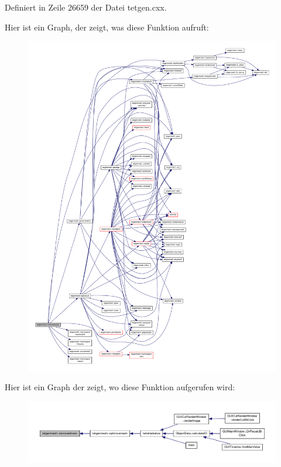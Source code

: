 Definiert in Zeile 26659 der Datei tetgen.\-cxx.



Hier ist ein Graph, der zeigt, was diese Funktion aufruft\-:
\nopagebreak
\begin{figure}[H]
\begin{center}
\leavevmode
\includegraphics[width=350pt]{classtetgenmesh_ad5c46c2f6c9adeed23fc8c64b682778d_cgraph}
\end{center}
\end{figure}




Hier ist ein Graph der zeigt, wo diese Funktion aufgerufen wird\-:
\nopagebreak
\begin{figure}[H]
\begin{center}
\leavevmode
\includegraphics[width=350pt]{classtetgenmesh_ad5c46c2f6c9adeed23fc8c64b682778d_icgraph}
\end{center}
\end{figure}


